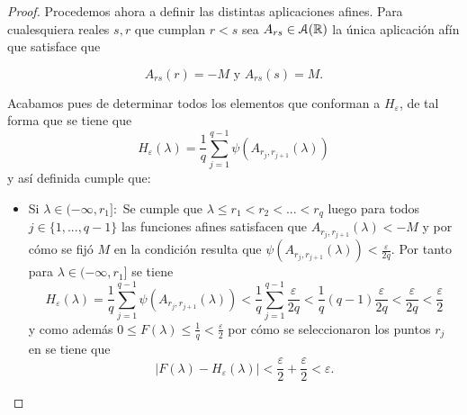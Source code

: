 \begin{proof}
    Procedemos ahora a definir las distintas aplicaciones afines. 
    Para cualesquiera reales $s,r$ que cumplan $r < s$ sea $A_{rs}\in \mathcal{A}(\mathbb{R})$ la única aplicación afín que satisface que 
    
    \begin{equation}
        A_{rs}(r) = -M \text{ y }  A_{rs}(s) = M. 
    \end{equation} 
    
    Acabamos pues de determinar todos los elementos que conforman a $H_\varepsilon$, de tal forma que se tiene que
    \begin{equation}
        H_\varepsilon(\lambda) = \frac{1}{q} \sum^{q-1}_{j=1} \psi( A_{r_j, r_{j+1}}(\lambda))
    \end{equation}
    y así definida cumple que: 
    \begin{itemize}
        \item Si $\lambda \in (- \infty, r_1]:$
        Se cumple que $\lambda \leq r_1 < r_2 <...< r_q$ luego  
        para todos $j \in \{1, ..., q-1\}$ las funciones afines satisfacen que 
        $A_{r_j, r_{j+1}}(\lambda) < -M$ y por cómo se fijó $M$ en la condición 
        resulta que  $\psi( A_{r_j, r_{j+1}}(\lambda)) < \frac{\varepsilon}{2 q}$. Por tanto
        para $\lambda \in (- \infty, r_1]$ se tiene 
        \begin{equation}
            H_\varepsilon(\lambda) = \frac{1}{q} \sum^{q-1}_{j=1} \psi( A_{r_j, r_{j+1}}(\lambda)) 
            <
            \frac{1}{q} \sum^{q-1}_{j=1}  \frac{\varepsilon}{2q}
            < 
            \frac{1}{q} (q-1) \frac{\varepsilon }{2q}
            <\frac{\varepsilon }{2q}
            < \frac{\varepsilon }{2}
        \end{equation}
        y como además $0 \leq F(\lambda) \leq \frac{1}{q} < \frac{\varepsilon}{2}$ por cómo se seleccionaron los puntos $r_j$ en 
         se tiene que 
        \begin{equation}
            | F(\lambda) - H_{\varepsilon}(\lambda) | < \frac{\varepsilon}{2} + \frac{\varepsilon}{2} < \varepsilon. 
        \end{equation}


\end{itemize}
\end{proof}
